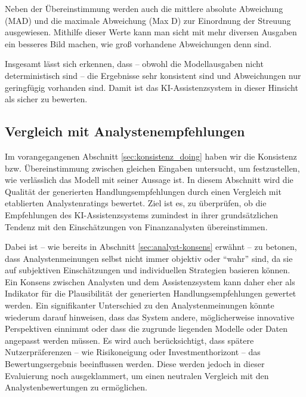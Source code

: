       Neben der Übereinstimmung werden auch die mittlere absolute Abweichung (MAD) und die maximale Abweichung (Max D) zur Einordnung der Streuung ausgewiesen.
      Mithilfe dieser Werte kann man sicht mit mehr diversen Ausgaben ein besseres Bild machen, wie groß vorhandene Abweichungen denn sind.

      Insgesamt lässt sich erkennen, dass -- obwohl die Modellausgaben nicht deterministisch sind -- die Ergebnisse sehr konsistent sind und Abweichungen nur geringfügig vorhanden sind.
      Damit ist das KI-Assistenzsystem in dieser Hinsicht als sicher zu bewerten.

    \subsection{Vergleich mit Analystenempfehlungen}

      Im vorangegangenen Abschnitt \ref{sec:konsistenz_doing} haben wir die Konsistenz bzw. Übereinstimmung zwischen gleichen Eingaben untersucht, um festzustellen, wie verlässlich das Modell mit seiner Aussage ist.
      In diesem Abschnitt wird die Qualität der generierten Handlungsempfehlungen durch einen Vergleich mit etablierten Analystenratings bewertet.
      Ziel ist es, zu überprüfen, ob die Empfehlungen des \acs{KI}-Assistenzsystems zumindest in ihrer grundsätzlichen Tendenz mit den Einschätzungen von Finanzanalysten übereinstimmen.

      Dabei ist -- wie bereits in Abschnitt \ref{sec:analyst-konsens} erwähnt -- zu betonen, dass Analystenmeinungen selbst nicht immer objektiv oder \enquote{wahr} sind, da sie auf subjektiven Einschätzungen und individuellen Strategien basieren können.
      Ein Konsens zwischen Analysten und dem Assistenzsystem kann daher eher als Indikator für die Plausibilität der generierten Handlungsempfehlungen gewertet werden.
      Ein signifikanter Unterschied zu den Analystenmeinungen könnte wiederum darauf hinweisen, dass das System andere, möglicherweise innovative Perspektiven einnimmt oder dass die zugrunde liegenden Modelle oder Daten angepasst werden müssen.
      Es wird auch berücksichtigt, dass spätere Nutzerpräferenzen -- wie Risikoneigung oder Investmenthorizont -- das Bewertungsergebnis beeinflussen werden.
      Diese werden jedoch in dieser Evaluierung noch ausgeklammert, um einen neutralen Vergleich mit den Analystenbewertungen zu ermöglichen.

